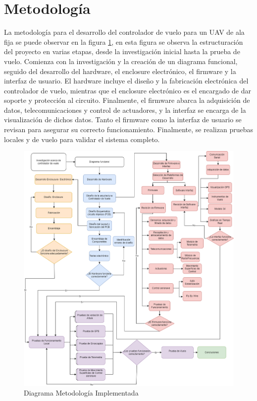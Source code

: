 \section{Metodología}
La metodología para el desarrollo del controlador de vuelo para un UAV de ala fija se puede observar en 
 la figura \ref{fig:diagrama metodo}, en esta figura se observa la estructuración del proyecto en varias etapas, desde la investigación inicial hasta la prueba de vuelo. Comienza con la investigación y la creación de un diagrama funcional, seguido del desarrollo del hardware, el enclosure electrónico, el firmware y la interfaz de usuario. El hardware incluye el diseño y la fabricación electrónica del controlador de vuelo, mientras que el enclosure electrónico es el encargado de dar soporte y protección al circuito. Finalmente, el firmware abarca la adquisición de datos, telecomunicaciones y control de actuadores, y la interfaz se encarga de la visualización de dichos datos. Tanto el firmware como la interfaz de usuario se revisan para asegurar su correcto funcionamiento. Finalmente, se realizan pruebas locales y de vuelo para validar el sistema completo.

\begin{figure}[H]
    \centering
    \includegraphics[width=14 cm]{Imagenes/Metodologia/metodologia.png}
    \caption{Diagrama Metodología Implementada}
    \label{fig:diagrama metodo}
\end{figure}

